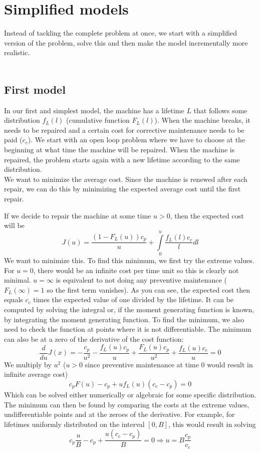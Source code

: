 \section{Simplified models}
Instead of tackling the complete problem at once, we start with a simplified version of the problem, solve this and then make the model incrementally more realistic.\\
\\
\subsection{First model}
In our first and simplest model, the machine has a lifetime $L$ that follows some distribution $f_L(l)$ (cumulative function $F_L(l)$). When the machine breaks, it needs to be repaired and a certain cost for corrective maintenance needs to be paid ($c_c$). We start with an open loop problem where we have to choose at the beginning at what time the machine will be repaired. 
When the machine is repaired, the problem starts again with a new lifetime according to the same distribution.\\
We want to minimize the average cost. Since the machine is renewed after each repair, we can do this by minimizing the expected average cost until the first repair.

If we decide to repair the machine at some time $u>0$, then the expected cost will be
$$
J(u)=\frac{(1-F_L(u))c_p}{u}+\int\limits_{0}^u\frac{f_L(l)c_c}{l}dl
$$
We want to minimize this. To find this minimum, we first try the extreme values. For $u=0$, there would be an infinite cost per time unit so this is clearly not minimal. $u=\infty$ is equivalent to not doing any preventive maintenance ($F_L(\infty)=1$ so the first term vanishes). As you can see, the expected cost then equals $c_c$ times the expected value of one divided by the lifetime. It can be computed by solving the integral or, if the moment generating function is known, by integrating the moment generating function. To find the minimum, we also need to check the function at points where it is not differentiable. The minimum can also be at a zero of the derivative of the cost function:
$$
\frac{d}{du}J(x)=-\frac{c_p}{u^2} - \frac{f_L(u)c_p}{u} +\frac{F_L(u)c_p}{u^2}+\frac{f_L(u)c_c}{u}=0
$$
We multiply by $u^2$ ($u>0$ since preventive maintenance at time 0 would result in infinite average cost)
$$
c_pF(u)-c_p+uf_L(u)(c_c-c_p)=0
$$
Which can be solved either numerically or algebraic for some specific distribution. The minimum can then be found by comparing the costs at the extreme values, undifferentiable points and at the zeroes of the derivative. For example, for lifetimes uniformly distributed on the interval $[0,B]$, this would result in solving
$$
c_p\frac{u}{B}-c_p+\frac{u(c_c-c_p)}{B}=0\Rightarrow u=B\frac{c_p}{c_c}
$$

